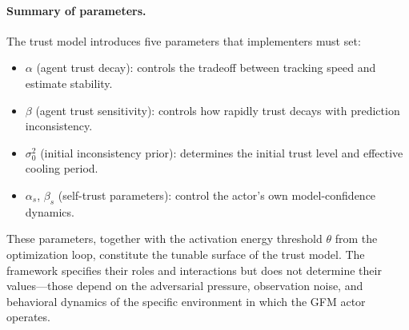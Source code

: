 \paragraph{Summary of parameters.} The trust model introduces five parameters that implementers must set:
\begin{itemize}
\item $\alpha$ (agent trust decay): controls the tradeoff between tracking speed and estimate stability.
\item $\beta$ (agent trust sensitivity): controls how rapidly trust decays with prediction inconsistency.
\item $\sigma_0^2$ (initial inconsistency prior): determines the initial trust level and effective cooling period.
\item $\alpha_s$, $\beta_s$ (self-trust parameters): control the actor's own model-confidence dynamics.
\end{itemize}
These parameters, together with the activation energy threshold $\theta$ from the optimization loop, constitute the tunable surface of the trust model. The framework specifies their roles and interactions but does not determine their values---those depend on the adversarial pressure, observation noise, and behavioral dynamics of the specific environment in which the GFM actor operates.
